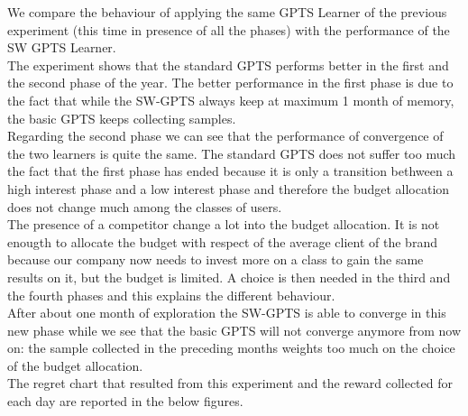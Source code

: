 We compare the behaviour of applying the same GPTS Learner of the previous experiment (this time in presence of all the phases) with the performance of the SW GPTS Learner.
\\The experiment shows that the standard GPTS performs better in the first and the second phase of the year.  The better performance in the first phase is due to the fact that while the SW-GPTS always keep at maximum 1 month of memory, the basic GPTS keeps collecting samples. 
\\Regarding the second phase we can see that the performance of convergence of the two learners is quite the same. The standard GPTS does not suffer too much the fact that the first phase has ended because it is only a transition bethween a high interest phase and a low interest phase and therefore the budget allocation does not change much among the classes of users.
\\The presence of a competitor change a lot into the budget allocation. It is not enougth to allocate the budget with respect of the average client of the brand because our company now needs to invest more on a class to gain the same results on it, but the budget is limited. A choice is then needed in the third and the fourth phases and this explains the different behaviour. 
\\After about one month of exploration the SW-GPTS is able to converge in this new phase while we see that the basic GPTS will not converge anymore from now on: the sample collected in the preceding months weights too much on the choice of the budget allocation.
\\The regret chart that resulted from this experiment and the reward collected for each day are reported in the below figures.\\
\newpage
{}
